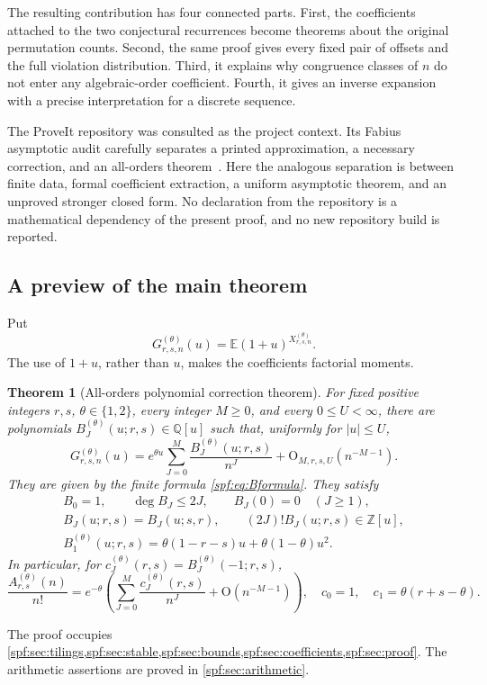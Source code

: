 \documentclass[11pt]{article}
\numberwithin{equation}{section}
\newtheorem{theorem}{Theorem}[section]
\theoremstyle{definition}
\theoremstyle{remark}
\theoremstyle{definition}
\newcommand{\E}{\mathbb E}
\newcommand{\Z}{\mathbb Z}
\newcommand{\Q}{\mathbb Q}
\newcommand{\bigO}{\mathrm O}
\begin{document}
The resulting contribution has four connected parts. First, the coefficients
attached to the two conjectural recurrences become theorems about the original
permutation counts. Second, the same proof gives every fixed pair of offsets
and the full violation distribution. Third, it explains why congruence classes
of $n$ do not enter any algebraic-order coefficient. Fourth, it gives an inverse
expansion with a precise interpretation for a discrete sequence.

The ProveIt repository was consulted as the project context. Its Fabius
asymptotic audit carefully separates a printed approximation, a necessary
correction, and an all-orders theorem~\cite{proveit}. Here the analogous
separation is between finite data, formal coefficient extraction, a uniform
asymptotic theorem, and an unproved stronger closed form. No declaration from
the repository is a mathematical dependency of the present proof, and no new
repository build is reported.

\subsection{A preview of the main theorem}

Put
\begin{equation}
 G^{(\theta)}_{r,s,n}(u)=\E(1+u)^{X^{(\theta)}_{r,s,n}}.
\end{equation}
The use of $1+u$, rather than $u$, makes the coefficients factorial moments.

\begin{theorem}[All-orders polynomial correction theorem]
\label{spf:thm:main}
For fixed positive integers $r,s$, $\theta\in\{1,2\}$, every integer $M\ge0$,
and every $0\le U<\infty$, there are polynomials
$B_J^{(\theta)}(u;r,s)\in\Q[u]$ such that, uniformly for $|u|\le U$,
\begin{equation}
 G^{(\theta)}_{r,s,n}(u)
 =e^{\theta u}\sum_{J=0}^{M}\frac{B_J^{(\theta)}(u;r,s)}{n^J}
   +\bigO_{M,r,s,U}(n^{-M-1}).
 \label{spf:eq:main}
\end{equation}
They are given by the finite formula \eqref{spf:eq:Bformula}. They satisfy
\begin{gather}
 B_0=1,\qquad \deg B_J\le2J,\qquad B_J(0)=0\quad(J\ge1),\\
 B_J(u;r,s)=B_J(u;s,r),\qquad (2J)!B_J(u;r,s)\in\Z[u],
 \label{spf:eq:arithmetic-preview}\\
 B_1^{(\theta)}(u;r,s)
 =\theta(1-r-s)u+\theta(1-\theta)u^2.
 \label{spf:eq:B1}
\end{gather}
In particular, for $c_J^{(\theta)}(r,s)=B_J^{(\theta)}(-1;r,s)$,
\begin{equation}
 \frac{A^{(\theta)}_{r,s}(n)}{n!}
 =e^{-\theta}\left(\sum_{J=0}^{M}\frac{c_J^{(\theta)}(r,s)}{n^J}
                   +\bigO(n^{-M-1})\right),
 \quad c_0=1,\quad c_1=\theta(r+s-\theta).
 \label{spf:eq:avoidance-expansion}
\end{equation}
\end{theorem}
The proof occupies \cref{spf:sec:tilings,spf:sec:stable,spf:sec:bounds,spf:sec:coefficients,spf:sec:proof}.
The arithmetic assertions are proved in \cref{spf:sec:arithmetic}.
\end{document}
